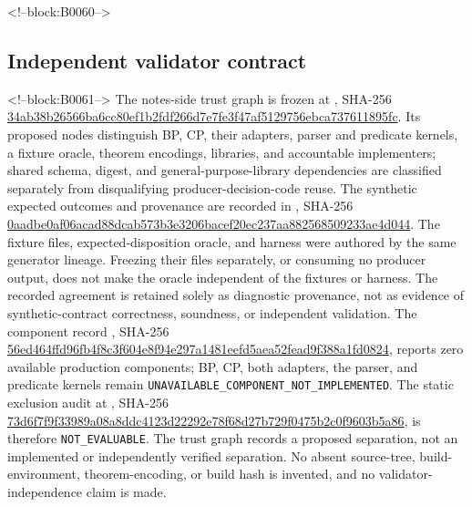\documentclass[11pt,a4paper]{article}
\begin{document}
<!--block:B0060-->
\hypertarget{independent-validator-contract}{%
\subsection{Independent validator contract}\label{independent-validator-contract}}

<!--block:B0061-->
The notes-side trust graph is frozen at , SHA-256 \url{34ab38b26566ba6cc80ef1b2fdf266d7e7fe3f47af5129756ebca737611895fc}. Its proposed nodes distinguish BP, CP, their adapters, parser and predicate kernels, a fixture oracle, theorem encodings, libraries, and accountable implementers; shared schema, digest, and general-purpose-library dependencies are classified separately from disqualifying producer-decision-code reuse. The synthetic expected outcomes and provenance are recorded in , SHA-256 \url{0aadbe0af06acad88dcab573b3e3206bacef20ec237aa882568509233ae4d044}. The fixture files, expected-disposition oracle, and harness were authored by the same generator lineage. Freezing their files separately, or consuming no producer output, does not make the oracle independent of the fixtures or harness. The recorded agreement is retained solely as diagnostic provenance, not as evidence of synthetic-contract correctness, soundness, or independent validation. The component record , SHA-256 \url{56ed464ffd96fb4f8c3f604e8f94e297a1481eefd5aea52fead9f388a1fd0824}, reports zero available production components; BP, CP, both adapters, the parser, and predicate kernels remain \texttt{UNAVAILABLE\_COMPONENT\_NOT\_IMPLEMENTED}. The static exclusion audit at , SHA-256 \url{73d6f7f9f33989a08a8ddc4123d22292e78f68d27b729f0475b2c0f9603b5a86}, is therefore \texttt{NOT\_EVALUABLE}. The trust graph records a proposed separation, not an implemented or independently verified separation. No absent source-tree, build-environment, theorem-encoding, or build hash is invented, and no validator-independence claim is made.
\end{document}
